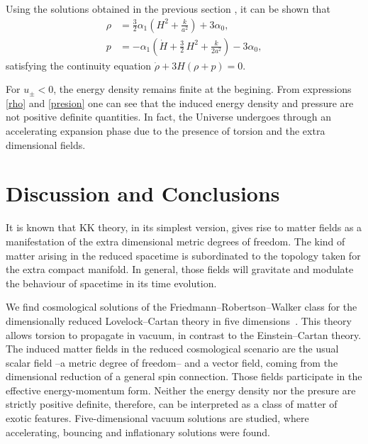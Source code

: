 \documentclass[aps,prd,12pt,superscriptaddress,showpacs,showkeys,longbibliography,reprint,nofootinbib]{revtex4-1}
\begin{document}
Using the solutions obtained in the previous section , it can be shown that
\begin{align}
  \rho &= \frac{3}{2}\alpha_1\left(H^2 + \frac{k}{a^2}\right) + 3\alpha_0, \\
  p &= -\alpha_1\left(\dot{H} + \frac{3}{2}\,H^2 + \frac{k}{2a^2}\right) - 3\alpha_0,
\end{align}
satisfying the continuity equation $\dot{\rho}+3H\left(\rho+p\right)=0$. 

For $u_\pm<0$, the energy density remains finite at the begining. From expressions \eqref{rho} and \eqref{presion} one can see that the induced energy density and pressure are not positive definite quantities. In fact, the Universe undergoes through an accelerating expansion phase due to the presence of torsion and the extra dimensional fields. 


\section{Discussion and Conclusions\label{conclusions}}

It is known that KK theory, in its simplest version, gives rise to matter fields as a manifestation of the extra dimensional metric degrees of freedom. The kind of matter arising in the reduced spacetime is subordinated to the topology taken for the extra compact manifold. In general, those fields will gravitate and modulate the behaviour of spacetime in its time evolution. 

We find cosmological solutions of the Friedmann--Robertson--Walker class for the dimensionally reduced Lovelock--Cartan theory in five dimensions~\cite{Mardones:1990qc}. This theory allows torsion to propagate in vacuum, in contrast to the Einstein--Cartan theory. The induced matter fields in the reduced cosmological scenario are the usual scalar field --a metric degree of freedom-- and a vector field, coming from the dimensional reduction of a general spin connection. Those fields participate in the effective energy-momentum form. Neither the energy density nor the presure are strictly positive definite, therefore, can be interpreted as a class of matter of exotic features. Five-dimensional vacuum solutions are studied, where accelerating, bouncing and inflationary solutions were found.
\end{document}

